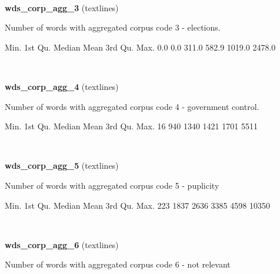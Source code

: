 \documentclass[]{article}
\newenvironment{Shaded}{\begin{snugshade}}{\end{snugshade}}
\newcommand{\DecValTok}[1]{\textcolor[rgb]{0.00,0.00,0.81}{{#1}}}
\newcommand{\FloatTok}[1]{\textcolor[rgb]{0.00,0.00,0.81}{{#1}}}
\newcommand{\NormalTok}[1]{{#1}}
\begin{document}
~

\vspace{1em}

\textbf{wds\_corp\_agg\_3} (textlines)

Number of words with aggregated corpus code 3 - elections.

\begin{Shaded}
\begin{Highlighting}[]
   \NormalTok{Min. 1st Qu.  Median    Mean 3rd Qu.    Max. }
    \FloatTok{0.0}     \FloatTok{0.0}   \FloatTok{311.0}   \FloatTok{582.9}  \FloatTok{1019.0}  \FloatTok{2478.0} 
\end{Highlighting}
\end{Shaded}

~

\vspace{1em}

\textbf{wds\_corp\_agg\_4} (textlines)

Number of words with aggregated corpus code 4 - government control.

\begin{Shaded}
\begin{Highlighting}[]
   \NormalTok{Min. 1st Qu.  Median    Mean 3rd Qu.    Max. }
     \DecValTok{16}     \DecValTok{940}    \DecValTok{1340}    \DecValTok{1421}    \DecValTok{1701}    \DecValTok{5511} 
\end{Highlighting}
\end{Shaded}

~

\vspace{1em}

\textbf{wds\_corp\_agg\_5} (textlines)

Number of words with aggregated corpus code 5 - puplicity

\begin{Shaded}
\begin{Highlighting}[]
   \NormalTok{Min. 1st Qu.  Median    Mean 3rd Qu.    Max. }
    \DecValTok{223}    \DecValTok{1837}    \DecValTok{2636}    \DecValTok{3385}    \DecValTok{4598}   \DecValTok{10350} 
\end{Highlighting}
\end{Shaded}

~

\vspace{1em}

\textbf{wds\_corp\_agg\_6} (textlines)

Number of words with aggregated corpus code 6 - not relevant
\end{document}
